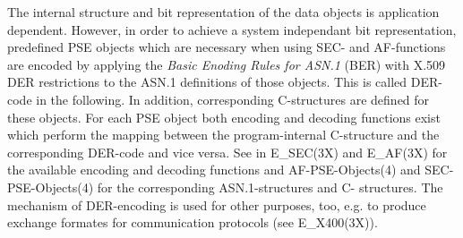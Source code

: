 \ei
The internal structure and bit representation of the data objects is 
application dependent. 
However, in order to achieve a system independant bit representation, 
predefined PSE objects 
which are necessary when using SEC- and AF-functions are encoded by 
applying
the {\em Basic Enoding Rules for ASN.1} (BER) with X.509 DER restrictions 
to the ASN.1 definitions 
of those objects. This is called DER-code in the following. In addition,
corresponding C-structures are defined for these objects. For each PSE 
object both encoding 
and decoding functions exist which perform
the mapping between the program-internal C-structure and the corresponding 
DER-code and vice versa.
See in E\_SEC(3X) and E\_AF(3X) for the available encoding and decoding 
functions and AF-PSE-Objects(4)
and SEC-PSE-Objects(4) for the corresponding ASN.1-structures and C-
structures. The mechanism
of DER-encoding is used for other purposes, too, e.g. to produce exchange 
formates for communication
protocols (see E\_X400(3X)).

